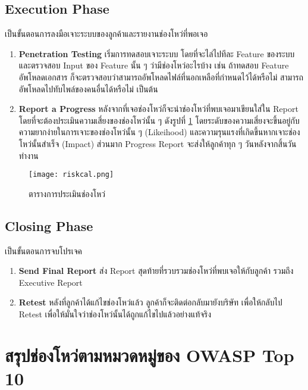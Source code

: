 \subsection{Execution Phase}

เป็นขั้นตอนการลงมือเจาะระบบของลูกค้าและรายงานช่องโหว่ที่พอเจอ

\begin{enumerate}
	\itemsep0em 
	\item \textbf{Penetration Testing} เริ่มการทดสอบเจาะระบบ โดยที่จะไล่ไปทีละ Feature ของระบบ และตรวจสอบ Input ของ Feature นั้น ๆ ว่ามีช่องโหว่อะไรบ้าง เช่น ถ้าทดสอบ Feature อัพโหลดเอกสาร ก็จะตรวจสอบว่าสามารถอัพโหลดไฟล์ที่นอกเหลือที่กำหนดไว้ได้หรือไม่  สามารถอัพโหลดไปทับไพล์ของคนอื่นได้หรือไม่ เป็นต้น
	\item \textbf{Report a Progress} หลังจากที่เจอช่องโหว่ก็จะนำช่องโหว่ที่พบเจอมาเขียนใส่ใน Report โดยที่จะต้องประเมินความเสี่ยงของช่องโหว่นั้น ๆ ดังรูปที่ \ref{Fig:riskcal} โดยระดับของความเสี่ยงจะขึ้นอยู่กับความยากง่ายในการเจาะของช่องโหว่นั้น ๆ (Likeihood) และความรุนแรงที่เกิดขึ้นหากเจาะช่องโหว่นั้นสำเร็จ (Impact) ส่วนมาก Progress Report จะส่งให้ลูกค้าทุก ๆ  วันหลังจากสิ้นวันทำงาน
	
\end{enumerate}

\begin{figure}[h]
	\centering
	\texttt{[image: riskcal.png]}
	\caption{ตารางการประเมินช่องโหว่}
	\label{Fig:riskcal}
\end{figure}

\subsection{Closing Phase}

เป็นขั้นตอนการจบโปรเจค

\begin{enumerate}
	\itemsep0em 
	\item \textbf{Send Final Report} ส่ง Report สุดท้ายที่รวบรวมช่องโหว่ที่พบเจอให้กับลูกค้า รวมถึง Executive Report
	\item \textbf{Retest} หลังที่ลูกค้าได้แก้ไขช่องโหว่แล้ว ลูกค้าก็จะติดต่อกลับมายังบริษัท เพื่อให้กลับไป Retest เพื่อให้มั่นใจว่าช่องโหว่นั้นได้ถูกแก้ไขไปแล้วอย่างแท้จริง
\end{enumerate}

\section{สรุปช่องโหว่ตามหมวดหมู่ของ OWASP Top 10}

